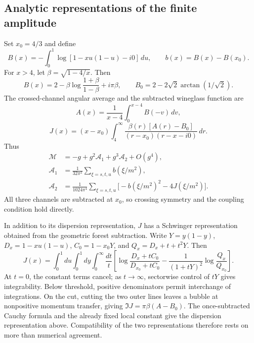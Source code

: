 \documentclass[11pt,a4paper,oneside]{article}
\theoremstyle{plain}
\theoremstyle{definition}
\theoremstyle{remark}
\numberwithin{equation}{section}
\begin{document}
\subsection{Analytic representations of the finite amplitude}
Set $x_0=4/3$ and define
\begin{equation}
 B(x)=-\int_0^1\log[1-xu(1-u)-i0]\,du,\qquad b(x)=B(x)-B(x_0).
\end{equation}
For $x>4$, let $\beta=\sqrt{1-4/x}$. Then
\begin{equation}
 B(x)=2-\beta\log\frac{1+\beta}{1-\beta}+i\pi\beta,\qquad
 B_0=2-2\sqrt2\arctan(1/\sqrt2).
\end{equation}
The crossed-channel angular average and the subtracted wineglass function are
\begin{equation}
 A(x)=\frac1{x-4}\int_0^{x-4}B(-v)\,dv,
\end{equation}
\begin{equation}
 J(x)=(x-x_0)\int_4^\infty
 \frac{\beta(r)[A(r)-B_0]}{(r-x_0)(r-x-i0)}\,dr.
\end{equation}
Thus
\begin{equation}
\begin{aligned}
 \mathcal M&=-g+g^2\mathcal A_1+g^3\mathcal A_2+O(g^4),\\
 \mathcal A_1&=\frac1{32\pi^2}\sum_{\xi=s,t,u}b(\xi/m^2),\\
 \mathcal A_2&=\frac1{1024\pi^4}\sum_{\xi=s,t,u}
 \bigl[-b(\xi/m^2)^2-4J(\xi/m^2)\bigr].
\end{aligned}
\end{equation}
All three channels are subtracted at $x_0$, so crossing symmetry and the coupling condition hold directly.

In addition to its dispersion representation, $J$ has a Schwinger representation obtained from the geometric forest subtraction. Write $Y=y(1-y)$, $D_x=1-xu(1-u)$, $C_0=1-x_0Y$, and $Q_x=D_x+t+t^2Y$. Then
\begin{equation}
 J(x)=\int_0^1du\int_0^1dy\int_0^\infty\frac{dt}{t}
 \left[\log\frac{D_x+tC_0}{D_{x_0}+tC_0}
 -\frac1{(1+tY)^2}\log\frac{Q_x}{Q_{x_0}}\right].
\end{equation}
At $t=0$, the constant terms cancel; as $t\to\infty$, sectorwise control of $tY$ gives integrability. Below threshold, positive denominators permit interchange of integrations. On the cut, cutting the two outer lines leaves a bubble at nonpositive momentum transfer, giving $\Im J=\pi\beta(A-B_0)$. The once-subtracted Cauchy formula and the already fixed local constant give the dispersion representation above. Compatibility of the two representations therefore rests on more than numerical agreement.
\end{document}
